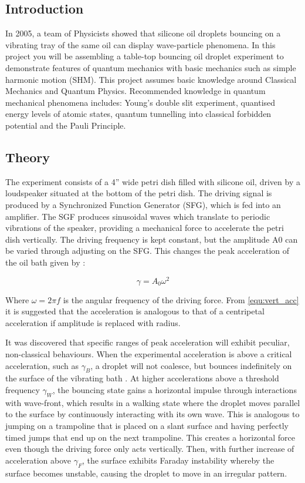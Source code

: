 \subsection{Introduction}

In 2005, a team of Physicists showed that silicone oil droplets bouncing on a vibrating tray of the same oil can display wave-particle phenomena. In this project you will be assembling a table-top bouncing oil droplet experiment to demonstrate features of quantum mechanics with basic mechanics such as simple harmonic motion (SHM). This project assumes basic knowledge around Classical Mechanics and Quantum Physics. Recommended knowledge in quantum mechanical phenomena includes: Young’s double slit experiment, quantised energy levels of atomic states, quantum tunnelling into classical forbidden potential and the Pauli Principle.


\subsection{Theory}

The experiment consists of a 4” wide petri dish filled with silicone oil, driven by a loudspeaker situated at the bottom of the petri dish. The driving signal is produced by a Synchronized Function Generator (SFG), which is fed into an amplifier. The SGF produces sinusoidal waves which translate to periodic vibrations of the speaker, providing a mechanical force to accelerate the petri dish vertically. The driving frequency is kept constant, but the amplitude A0 can be varied through adjusting on the SFG. This changes the peak acceleration of the oil bath given by \cite{harris2017visualization}:

\begin{equation}
\gamma =A_0{\omega }^2
\label{equ:vert_acc}
\end{equation}

Where $\omega =2\pi f$ is the angular frequency of the driving force. From \ref{equ:vert_acc} it is suggested that the acceleration is analogous to that of a centripetal acceleration if amplitude is replaced with radius.

It was discovered that specific ranges of peak acceleration will exhibit peculiar, non-classical behaviours. When the experimental acceleration is above a critical acceleration, such as ${\gamma }_B$, a droplet will not coalesce, but bounces indefinitely on the surface of the vibrating bath \cite{brady2014bouncing}. At  higher accelerations above a threshold frequency ${\gamma }_W$, the bouncing state gains a horizontal impulse through interactions with wave-front, which results in a walking state where the droplet moves parallel to the surface by continuously interacting with its own wave. This is analogous to jumping on a trampoline that is placed on a slant surface and having perfectly timed jumps that end up on the next trampoline. This creates a horizontal force even though the driving force only acts vertically. Then, with further increase of acceleration above ${\gamma }_F$, the surface exhibits Faraday instability whereby the surface becomes unstable, causing the droplet to move in an irregular pattern.

